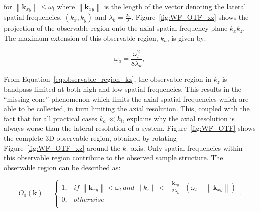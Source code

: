 for $\left\|\textbf{k}_{xy}\right\| \le \omega_{l}$ where 
$\left\|\textbf{k}_{xy}\right\|$ is the length of the vector denoting the 
lateral spatial frequencies, $(k_{x},k_{y})$ and $\lambda_{k} = 
\frac{2\pi}{\lambda}$\cite{frieden1967optical}. Figure~\ref{fig:WF_OTF_xz} shows 
the projection of the observable region onto the axial spatial frequency plane 
$k_{x}k_{z}$. The maximum extension of this observable region, $k_{a}$, is given 
by:

\begin{equation}\label{eq:axial_observable_max_k}
\omega_{a} = \frac{\omega_{l}^{2}}{8\lambda_{k}},
\end{equation}

From Equation~\ref{eq:observable_region_kz}, the observable
region in $k_{z}$ is bandpass limited at both high and low spatial frequencies.
This results in the ``missing cone'' phenomenon which limits the axial spatial 
frequencies which are able to be collected, in turn limiting the axial 
resolution\cite{behan2009three,arnison20023d}. This, coupled with the fact that
for all practical cases $k_{a} \ll k_{l}$, explains why the axial resolution is
always worse than the lateral resolution of a system. Figure~\ref{fig:WF_OTF} 
shows the complete 3D observable region, obtained by rotating 
Figure~\ref{fig:WF_OTF_xz} around the $k_{z}$ axis. Only spatial frequencies
within this observable region contribute to the observed sample structure.
The observable region can be described as:

\begin{equation}\label{eq:observable region}
O_{0}(\textbf{k}) = 
\begin{cases}
1, & if~ \left\|\textbf{k}_{xy}\right\| < \omega_{l} ~and~ \left\|k_{z}\right\| < \frac{\left\|\textbf{k}_{xy}\right\|}{2\lambda_{k}}(\omega_{l} - \left\|\textbf{k}_{xy}\right\|)\\
0, & otherwise\\
\end{cases}.
\end{equation}

